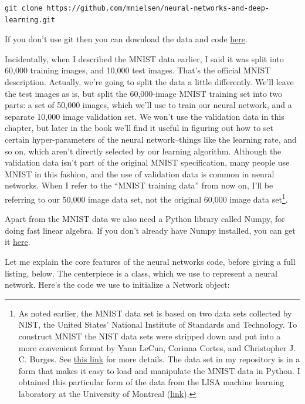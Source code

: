 \documentclass[a4paper,twoside,10pt]{book}
\begin{document}
\begin{lstlisting}
git clone https://github.com/mnielsen/neural-networks-and-deep-learning.git
\end{lstlisting}
If you don't use git then you can download the data and code \href{https://github.com/mnielsen/neural-networks-and-deep-learning/archive/master.zip}{here}.

Incidentally, when I described the MNIST data earlier, I said it was split into 60,000 training images, and 10,000 test images. That's the official MNIST description. Actually, we're going to split the data a little differently. We'll leave the test images as is, but split the 60,000-image MNIST training set into two parts: a set of 50,000 images, which we'll use to train our neural network, and a separate 10,000 image validation set. We won't use the validation data in this chapter, but later in the book we'll find it useful in figuring out how to set certain hyper-parameters of the neural network--things like the learning rate, and so on, which aren't directly selected by our learning algorithm. Although the validation data isn't part of the original MNIST specification, many people use MNIST in this fashion, and the use of validation data is common in neural networks. When I refer to the ``MNIST training data'' from now on, I'll be referring to our 50,000 image data set, not the original 60,000 image data set\footnote{As noted earlier, the MNIST data set is based on two data sets collected by NIST, the United States' National Institute of Standards and Technology. To construct MNIST the NIST data sets were stripped down and put into a more convenient format by Yann LeCun, Corinna Cortes, and Christopher J. C. Burges. See \href{http://yann.lecun.com/exdb/mnist/}{this link} for more details. The data set in my repository is in a form that makes it easy to load and manipulate the MNIST data in Python. I obtained this particular form of the data from the LISA machine learning laboratory at the University of Montreal (\href{http://www.deeplearning.net/tutorial/gettingstarted.html}{link}).}.

Apart from the MNIST data we also need a Python library called Numpy, for doing fast linear algebra. If you don't already have Numpy installed, you can get it \href{http://www.scipy.org/install.html}{here}.

Let me explain the core features of the neural networks code, before giving a full listing, below. The centerpiece is a  class, which we use to represent a neural network. Here's the code we use to initialize a Network object:
\end{document}
